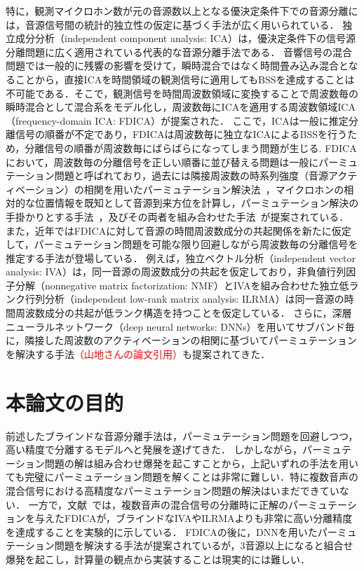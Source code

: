 特に，観測マイクロホン数が元の音源数以上となる優決定条件下での音源分離には，音源信号間の統計的独立性の仮定に基づく手法が広く用いられている．
独立成分分析（independent component analysis: ICA）\cite{ICA}は，優決定条件下の信号源分離問題に広く適用されている代表的な音源分離手法である．
音響信号の混合問題では一般的に残響の影響を受けて，瞬時混合ではなく時間畳み込み混合となることから，直接ICAを時間領域の観測信号に適用してもBSSを達成することは不可能である．そこで，観測信号を時間周波数領域に変換することで周波数毎の瞬時混合として混合系をモデル化し，周波数毎にICAを適用する周波数領域ICA（frequency-domain ICA: FDICA）\cite{FDICA}が提案された．
ここで，ICAは一般に推定分離信号の順番が不定であり，FDICAは周波数毎に独立なICAによるBSSを行うため，分離信号の順番が周波数毎にばらばらになってしまう問題が生じる.
FDICAにおいて，周波数毎の分離信号を正しい順番に並び替える問題は一般にパーミュテーション問題と呼ばれており，過去には隣接周波数の時系列強度（音源アクティベーション）の相関を用いたパーミュテーション解決法~\cite{COR}，マイクロホンの相対的な位置情報を既知として音源到来方位を計算し，パーミュテーション解決の手掛かりとする手法~\cite{DOA}，及びその両者を組み合わせた手法~\cite{DOACOR}が提案されている．
また，近年ではFDICAに対して音源の時間周波数成分の共起関係を新たに仮定して，パーミュテーション問題を可能な限り回避しながら周波数毎の分離信号を推定する手法が登場している．
例えば，独立ベクトル分析（independent vector analysis: IVA）\cite{IVA1,IVA2}は，同一音源の周波数成分の共起を仮定しており，非負値行列因子分解（nonnegative matrix factorization: NMF）\cite{NMF}とIVAを組み合わせた独立低ランク行列分析（independent low-rank matrix analysis: ILRMA）\cite{ILRMA1,ILRMA2}は同一音源の時間周波数成分の共起が低ランク構造を持つことを仮定している．
さらに，深層ニューラルネットワーク（deep neural networks: DNNs）を用いてサブバンド毎に，隣接した周波数のアクティベーションの相関に基づいてパーミュテーションを解決する手法\textcolor{red}{（山地さんの論文引用）}も提案されてきた．

\section{本論文の目的}
前述したブラインドな音源分離手法は，パーミュテーション問題を回避しつつ，高い精度で分離するモデルへと発展を遂げてきた．
しかしながら，パーミュテーション問題の解は組み合わせ爆発を起こすことから，上記いずれの手法を用いても完璧にパーミュテーション問題を解くことは非常に難しい．特に複数音声の混合信号における高精度なパーミュテーション問題の解決はいまだできていない．
一方で，文献~\cite{EU}では，複数音声の混合信号の分離時に正解のパーミュテーションを与えたFDICAが，ブラインドなIVAやILRMAよりも非常に高い分離精度を達成することを実験的に示している．
FDICAの後に，DNNを用いたパーミュテーション問題を解決する手法が提案されているが，3音源以上になると組合せ爆発を起こし，計算量の観点から実装することは現実的には難しい．

